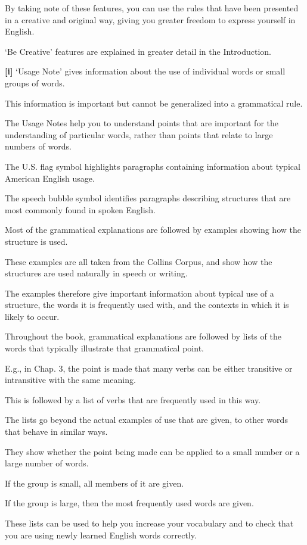 \documentclass[oneside]{book}
\numberwithin{equation}{section}
\begin{document}
By taking note of these features, you can use the rules that have been presented in a creative and original way, giving you greater freedom to express yourself in English.

`Be Creative' features are explained in greater detail in the Introduction.

%
\textbf{[i]} `Usage Note' gives information about the use of individual words or small groups of words.

This information is important but cannot be generalized into a grammatical rule.

The Usage Notes help you to understand points that are important for the understanding of particular words, rather than points that relate to large numbers of words.

%
The U.S. flag symbol highlights paragraphs containing information about typical American English usage.

%
The speech bubble symbol identifies paragraphs describing structures that are most commonly found in spoken English.

%
Most of the grammatical explanations are followed by examples showing how the structure is used.

These examples are all taken from the Collins Corpus, and show how the structures are used naturally in speech or writing.

The examples therefore give important information about typical use of a structure, the words it is frequently used with, and the contexts in which it is likely to occur.

%
Throughout the book, grammatical explanations are followed by lists of the words that typically illustrate that grammatical point.

E.g., in Chap. 3, the point is made that many verbs can be either transitive or intransitive with the same meaning.

This is followed by a list of verbs that are frequently used in this way.

%
The lists go beyond the actual examples of use that are given, to other words that behave in similar ways.

They show whether the point being made can be applied to a small number or a large number of words.

If the group is small, all members of it are given.

If the group is large, then the most frequently used words are given.

%
These lists can be used to help you increase your vocabulary and to check that you are using newly learned English words correctly.
\end{document}
